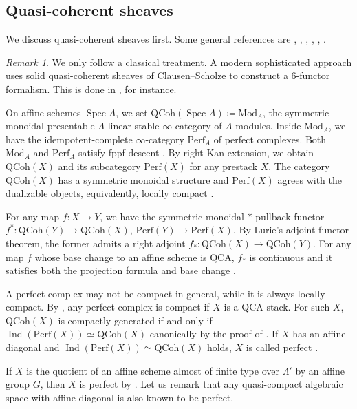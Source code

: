 \documentclass{amsart}
\theoremstyle{definition}
\theoremstyle{remark}
\newtheorem{remark}[theorem]{Remark}
\numberwithin{equation}{section}
\DeclareMathOperator{\Spec}{Spec}
\DeclareMathOperator{\Ind}{Ind}
\newcommand{\QCoh}{\mathrm{QCoh}}
\newcommand{\Mod}{\mathrm{Mod}}
\newcommand{\Perf}{\mathrm{Perf}}
\begin{document}
\subsection{Quasi-coherent sheaves}\label{ss: QCoh}
We discuss quasi-coherent sheaves first. Some general references are \cite{BenZviFrancisNadler}, \cite[Ch.~3]{GRI}, \cite{DrinfeldGaitsgory}, \cite[Appendix A]{HalpernLeistnerPreygel}, \cite[\S 9.2]{ZhuTame}, \cite[\S 2.3]{HansenMann}. 

\begin{remark}
We only follow a classical treatment. A modern sophisticated approach uses solid quasi-coherent sheaves of Clausen--Scholze to construct a 6-functor formalism. This is done in \cite[\S 2.7]{HansenMann}, for instance. 
\end{remark}

On affine schemes $\Spec A$, we set $\QCoh(\Spec A)\coloneq\Mod_A$, the symmetric monoidal presentable $\Lambda$-linear stable $\infty$-category of $A$-modules. Inside $\Mod_A$, we have the idempotent-complete $\infty$-category $\Perf_A$ of perfect complexes. Both $\Mod_A$ and $\Perf_A$ satisfy fppf descent \cite[Corollary 1.3.5, Corollary 3.6.5]{GRI}. By right Kan extension, we obtain $\QCoh(X)$ and its subcategory $\Perf(X)$ for any prestack $X$. The category $\QCoh(X)$ has a symmetric monoidal structure and $\Perf(X)$ agrees with the dualizable objects, equivalently, locally compact \cite[Lemma 3.3.6.7]{GRI}.  

For any map $f\colon X\to Y$, we have the symmetric monoidal $*$-pullback functor $f^*\colon \QCoh(Y)\to \QCoh(X)$, $\Perf(Y)\to \Perf(X)$. By Lurie's adjoint functor theorem, the former admits a right adjoint $f_*\colon \QCoh(X)\to \QCoh(Y)$. For any map $f$ whose base change to an affine scheme is QCA, $f_*$ is continuous and it satisfies both the projection formula and base change \cite[Corollary 1.4.5]{DrinfeldGaitsgory}. 

A perfect complex may not be compact in general, while it is always locally compact. By \cite[Theorem 1.3.2]{DrinfeldGaitsgory}, any perfect complex is compact if $X$ is a QCA stack. For such $X$, $\QCoh(X)$ is compactly generated if and only if $\Ind(\Perf(X))\simeq \QCoh(X)$ canonically by the proof of \cite[Proposition 3.9]{BenZviFrancisNadler}. If $X$ has an affine diagonal and $\Ind(\Perf(X))\simeq \QCoh(X)$ holds, $X$ is called perfect \cite[Definition 3.2]{BenZviFrancisNadler}. 

If $X$ is the quotient of an affine scheme almost of finite type over $\Lambda'$ by an affine group $G$, then $X$ is perfect by \cite[Proposition 3.21]{BenZviFrancisNadler}. Let us remark that any quasi-compact algebraic space with affine diagonal is also known to be perfect. 
\end{document}
